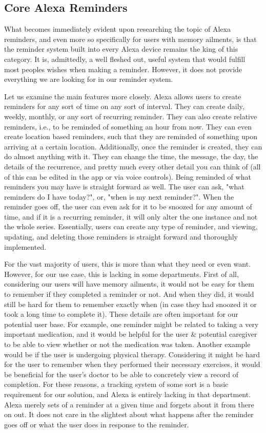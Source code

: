 \documentclass[11pt, oneside]{article}
\begin{document}
\subsection{Core Alexa Reminders}

What becomes immediately evident upon researching the topic of Alexa reminders, and even more so specifically for users with memory ailments, is that the reminder system built into every Alexa device remains the king of this category. 
It is, admittedly, a well fleshed out, useful system that would fulfill most peoples wishes when making a reminder. 
However, it does not provide everything we are looking for in our reminder system. 

Let us examine the main features more closely. 
Alexa allows users to create reminders for any sort of time on any sort of interval. 
They can create daily, weekly, monthly, or any sort of recurring reminder. 
They can also create relative reminders, i.e., to be reminded of something an hour from now. 
They can even create location based reminders, such that they are reminded of something upon arriving at a certain location. 
Additionally, once the reminder is created, they can do almost anything with it. 
They can change the time, the message, the day, the details of the recurrence, and pretty much every other detail you can think of (all of this can be edited in the app or via voice controls).
Being reminded of what reminders you may have is straight forward as well. The user can ask, "what reminders do I have today?", or, "when is my next reminder?". 
When the reminder goes off, the user can even ask for it to be snoozed for any amount of time, and if it is a recurring reminder, it will only alter the one instance and not the whole series. 
Essentially, users can create any type of reminder, and viewing, updating, and deleting those reminders is straight forward and thoroughly implemented.  

For the vast majority of users, this is more than what they need or even want. 
However, for our use case, this is lacking in some departments. 
First of all, considering our users will have memory ailments, it would not be easy for them to remember if they completed a reminder or not. 
And when they did, it would still be hard for them to remember exactly when (in case they had snoozed it or took a long time to complete it).
These details are often important for our potential user base. 
For example, one reminder might be related to taking a very important medication, and it would be helpful for the user \& potential caregiver to be able to view whether or not the medication was taken. 
Another example would be if the user is undergoing physical therapy. Considering it might be hard for the user to remember when they performed their necessary exercises, it would be beneficial for the user's doctor to be able to concretely view a record of completion. 
For these reasons, a tracking system of some sort is a basic requirement for our solution, and Alexa is entirely lacking in that department. 
Alexa merely sets of a reminder at a given time and forgets about it from there on out. 
It does not care in the slightest about what happens after the reminder goes off or what the user does in response to the reminder. 
\end{document}
